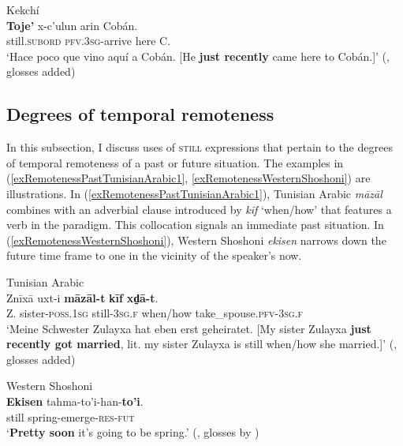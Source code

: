\begin{exe}
	\ex Kekchí\label{exEventSequencingKekchi3}\\
	\gll \textbf{Toje'} x-c’ulun arin Cobán.\\
	still.\textsc{subord} \textsc{pfv}.3\textsc{sg}-arrive here C.\\
	\glt \lq Hace poco que vino aquí a Cobán. [He \textbf{just recently} came here to Cobán.]' (\cite[202]{EachusCarlson1980}, glosses added)
\end{exe}

\subsection{Degrees of temporal remoteness}
\label{sectionRemoteness}
In this subsection, I discuss uses of \textsc{still} expressions that pertain to the degrees of temporal remoteness of a past or future situation. The examples in (\ref{exRemotenessPastTunisianArabic1}, \ref{exRemotenessWesternShoshoni}) are illustrations. In (\ref{exRemotenessPastTunisianArabic1}), Tunisian Arabic \textit{māzāl} combines with an adverbial clause introduced by \textit{kīf} \lq when/how' that features a verb in the   paradigm. This collocation signals an immediate past situation. In (\ref{exRemotenessWesternShoshoni}), Western Shoshoni \textit{ekisen} narrows down the future time frame to one in the vicinity of the speaker's now.

\begin{exe}
	\ex Tunisian Arabic\label{exRemotenessPastTunisianArabic1}\\
	\gll Znīxā uxt-i \textbf{māzāl-t} \textbf{kīf} \textbf{xd̠ā-t}.\\
	Z. sister-\textsc{poss}.1\textsc{sg} still-3\textsc{sg}.\textsc{f} when/how take\_spouse.\textsc{pfv}-3\textsc{sg}.\textsc{f}\\
	\glt \lq Meine Schwester Zulayxa hat eben erst geheiratet. [My sister Zulayxa \textbf{just recently got married}, lit. my sister Zulayxa is still when/how she married.]' (\cite[651]{Singer1984},  glosses added)
	
	\ex Western Shoshoni \label{exRemotenessWesternShoshoni}\\
	\gll \textbf{Ekisen} tahma-to'i-han-\textbf{to'i}.\\
	still spring-emerge-\textsc{res}-\textsc{fut}\\
	\glt \lq \textbf{Pretty soon} it’s going to be spring.\rq{ }(\cite[150]{CrumDayley1993}, glosses by \cite[68]{McLaughlin2012})
\end{exe}

